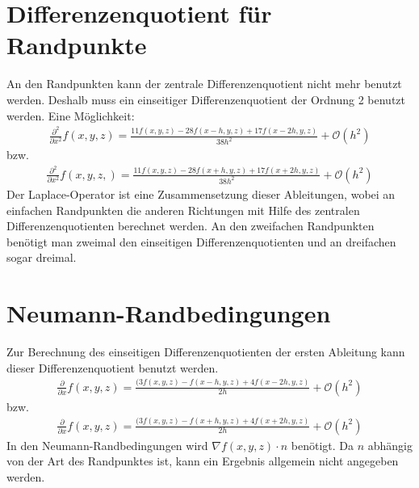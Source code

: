 \documentclass[pdflatex,12pt,a4paper,twoside]{scrartcl}
\begin{document}
\section{Differenzenquotient für Randpunkte}
An den Randpunkten kann der zentrale Differenzenquotient nicht mehr benutzt werden.
Deshalb muss ein einseitiger Differenzenquotient der Ordnung 2 benutzt werden.
Eine Möglichkeit:
\begin{align*}
\frac{\partial^2}{\partial x^2}f(x,y,z)=\frac{11f(x,y,z)-28f(x-h,y,z)+17f(x-2h,y,z)}{38h^2}+\mathcal O(h^2)
\end{align*}
bzw.
\begin{align*}
\frac{\partial^2}{\partial x^2}f(x,y,z,)=\frac{11f(x,y,z)-28f(x+h,y,z)+17f(x+2h,y,z)}{38h^2}+\mathcal O(h^2)
\end{align*}
Der Laplace-Operator ist eine Zusammensetzung dieser Ableitungen, wobei an einfachen Randpunkten die anderen Richtungen mit Hilfe des zentralen Differenzenquotienten berechnet werden.
An den zweifachen Randpunkten benötigt man zweimal den einseitigen Differenzenquotienten und an dreifachen sogar dreimal.

\section{Neumann-Randbedingungen}
Zur Berechnung des einseitigen Differenzenquotienten der ersten Ableitung kann dieser Differenzenquotient benutzt werden.
\begin{align*}
\frac{\partial}{\partial x}f(x,y,z)=\frac{(3f(x,y,z)-f(x-h,y,z)+4f(x-2h,y,z)}{2h}+\mathcal O(h^2)
\end{align*}
bzw.
\begin{align*}
\frac{\partial}{\partial x}f(x,y,z)=\frac{(3f(x,y,z)-f(x+h,y,z)+4f(x+2h,y,z)}{2h}+\mathcal O(h^2)
\end{align*} 
In den Neumann-Randbedingungen wird $\nabla f(x,y,z) \cdot n$ benötigt. Da $n$ abhängig von der Art des Randpunktes ist, kann ein Ergebnis allgemein nicht angegeben werden.
\end{document}
